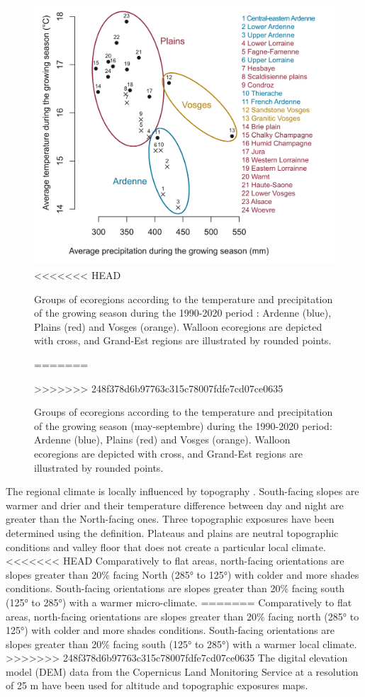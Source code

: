 \documentclass[3p,procedia]{elsarticle}
\begin{document}
\begin{figure}[htbp] 
	\centering
	\includegraphics[width=0.8\linewidth]{climat/climat_region.png}
<<<<<<< HEAD
	\caption{Groups of ecoregions according to the temperature and precipitation of the growing season during the 1990-2020 period : Ardenne (blue), Plains (red) and Vosges (orange). Walloon ecoregions are depicted with cross, and Grand-Est regions are illustrated by rounded points.}
=======
	\caption{Groups of ecoregions according to the temperature and precipitation of the growing season (may-septembre) during the 1990-2020 period: Ardenne (blue), Plains (red) and Vosges (orange). Walloon ecoregions are depicted with cross, and Grand-Est regions are illustrated by rounded points.}
>>>>>>> 248f378d6b97763c315c78007fdfe7cd07ce0635
	\label{fig:clim}
\end{figure}

The regional climate is locally influenced by topography \citep{de_frenne_forest_2021}.
South-facing slopes are warmer and drier and their temperature difference between day and night are greater than the North-facing ones.
Three topographic exposures have been determined using the \cite{Delvaux_galoux} definition.
Plateaus and plains are neutral topographic conditions and valley floor that does not create a particular local climate.
<<<<<<< HEAD
Comparatively to flat areas, north-facing orientations are slopes greater than  20\% facing North (285° to 125°) with colder and more shades conditions.
South-facing orientations are slopes greater than  20\% facing south (125° to 285°) with a warmer micro-climate.
=======
Comparatively to flat areas, north-facing orientations are slopes greater than  20\% facing north (285° to 125°) with colder and more shades conditions.
South-facing orientations are slopes greater than  20\% facing south (125° to 285°) with a warmer local climate.
>>>>>>> 248f378d6b97763c315c78007fdfe7cd07ce0635
The digital elevation model (DEM) data from the Copernicus Land Monitoring Service \citep{DEM_copernicus} at a resolution of 25 m have been used for altitude and topographic exposures maps.
\end{document}

